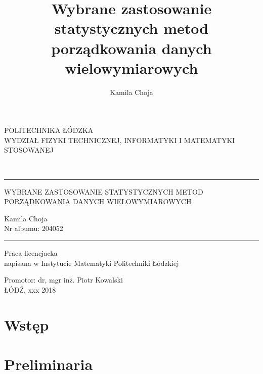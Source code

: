 \documentclass[12pt,a4paper]{report}
\author{Kamila Choja}
\title{Wybrane zastosowanie statystycznych metod porządkowania danych wielowymiarowych}
\begin{document}
\begin{titlepage}
\begin{center}
        \vspace*{1cm}
        {\large POLITECHNIKA ŁÓDZKA}\\
       \vspace*{1cm}
        {\large WYDZIAŁ FIZYKI TECHNICZNEJ, INFORMATYKI I MATEMATYKI STOSOWANEJ}\\
        \vspace*{2cm}
    \end{center}        
        
\\
\vspace*{0.3cm}
\hspace*{0.3cm}
  
\begin{center}
\rule{\textwidth}{0.5pt}

\vspace*{0.5cm}
   
{\large WYBRANE ZASTOSOWANIE STATYSTYCZNYCH METOD\\ }
{\large PORZĄDKOWANIA DANYCH WIELOWYMIAROWYCH\\}
\vspace*{1cm}


\begin{flushright}
Kamila Choja\\
Nr albumu: 204052 
 \end{flushright}
\rule{\textwidth}{0.5pt}

Praca licencjacka\\
napisana w Instytucie Matematyki Politechniki Łódzkiej\\

\vspace*{2cm}

Promotor: dr, mgr inż. Piotr Kowalski\\
\vfill
ŁÓDŹ, xxx 2018


     \end{center}   
\end{titlepage}

\tableofcontents

\chapter{Wstęp}


\chapter{Preliminaria}  
\end{document}

